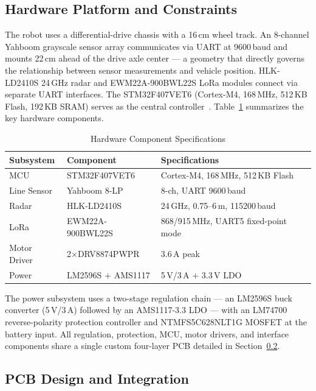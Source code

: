 \documentclass[letterpaper,journal]{IEEEtran}
\begin{document}
\subsection{Hardware Platform and Constraints}

The robot uses a differential-drive chassis with a 16\,cm wheel track. An 8-channel Yahboom grayscale sensor array communicates via UART at 9600\,baud and mounts 22\,cm ahead of the drive axle center --- a geometry that directly governs the relationship between sensor measurements and vehicle position. HLK-LD2410S 24\,GHz radar and EWM22A-900BWL22S LoRa modules connect via separate UART interfaces. The STM32F407VET6 (Cortex-M4, 168\,MHz, 512\,KB Flash, 192\,KB SRAM) serves as the central controller~\cite{stm32f407_ref}. Table~\ref{tab:hw-specs} summarizes the key hardware components.

\begin{table}[!t]
    \caption{Hardware Component Specifications}
    \label{tab:hw-specs}
    \centering
    \footnotesize
    \begin{tabular}{@{}p{}p{}p{}@{}}
        \toprule
        \textbf{Subsystem} & \textbf{Component} & \textbf{Specifications} \\
        \midrule
        MCU & STM32F407VET6 & Cortex-M4, 168\,MHz, 512\,KB Flash \\
        Line Sensor & Yahboom 8-LP & 8-ch, UART 9600\,baud \\
        Radar & HLK-LD2410S & 24\,GHz, 0.75--6\,m, 115200\,baud \\
        LoRa & EWM22A-900BWL22S & 868/915\,MHz, UART5 fixed-point mode \\
        Motor Driver & 2$\times$DRV8874PWPR & 3.6\,A peak \\
        Power & LM2596S $+$ AMS1117 & 5\,V/3\,A $+$ 3.3\,V LDO \\
        \bottomrule
    \end{tabular}
\end{table}

The power subsystem uses a two-stage regulation chain --- an LM2596S buck converter (5\,V/3\,A) followed by an AMS1117-3.3 LDO --- with an LM74700 reverse-polarity protection controller and NTMFS5C628NLT1G MOSFET at the battery input. All regulation, protection, MCU, motor drivers, and interface components share a single custom four-layer PCB detailed in Section~\ref{subsec:pcb}.

\subsection{PCB Design and Integration}
\label{subsec:pcb}
\end{document}
